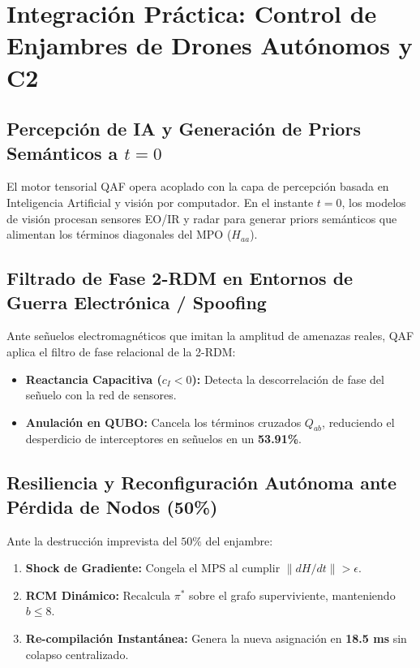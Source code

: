 \documentclass[11pt,a4paper,oneside]{report}
\begin{document}
\chapter{Integración Práctica: Control de Enjambres de Drones Autónomos y C2}
\label{cap:enjambres_drones_c2}

\section{Percepción de IA y Generación de Priors Semánticos a $t=0$}
El motor tensorial QAF opera acoplado con la capa de percepción basada en Inteligencia Artificial y visión por computador. En el instante $t=0$, los modelos de visión procesan sensores EO/IR y radar para generar priors semánticos que alimentan los términos diagonales del MPO ($H_{aa}$).

\section{Filtrado de Fase 2-RDM en Entornos de Guerra Electrónica / Spoofing}
Ante señuelos electromagnéticos que imitan la amplitud de amenazas reales, QAF aplica el filtro de fase relacional de la 2-RDM:
\begin{itemize}
    \item \textbf{Reactancia Capacitiva ($c_I < 0$):} Detecta la descorrelación de fase del señuelo con la red de sensores.
    \item \textbf{Anulación en QUBO:} Cancela los términos cruzados $Q_{ab}$, reduciendo el desperdicio de interceptores en señuelos en un \textbf{53.91\%}.
\end{itemize}

\section{Resiliencia y Reconfiguración Autónoma ante Pérdida de Nodos (50\%)}
Ante la destrucción imprevista del $50\%$ del enjambre:
\begin{enumerate}
    \item \textbf{Shock de Gradiente:} Congela el MPS al cumplir $\|dH/dt\| > \epsilon$.
    \item \textbf{RCM Dinámico:} Recalcula $\pi^*$ sobre el grafo superviviente, manteniendo $b \le 8$.
    \item \textbf{Re-compilación Instantánea:} Genera la nueva asignación en \textbf{18.5 ms} sin colapso centralizado.
\end{enumerate}
\end{document}

